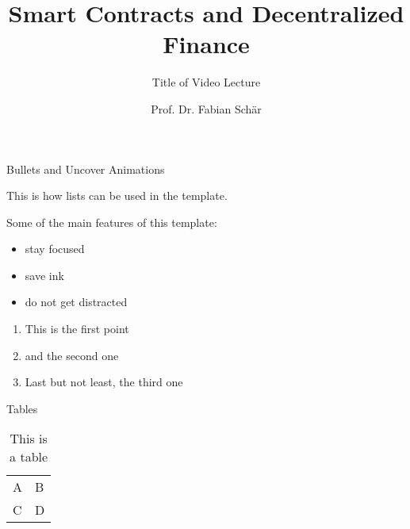 \documentclass[]{beamer}
\title{Smart Contracts and Decentralized Finance}
\subtitle{Title of Video Lecture}
\author{Prof. Dr. Fabian Schär}
\institute{University of Basel}
\begin{document}
\thispagestyle{empty}
\begin{frame}[noframenumbering]
	\titlepage
\end{frame}

\begin{frame}{Bullets and Uncover Animations}

This is how lists can be used in the template. \\ \vspace{1em}

Some of the main features of this template:
	
	\begin{itemize}
		\item<1-> stay focused
		\item<2-> save ink
		\item<3-> do not get distracted
	\end{itemize}

	\vspace{1em}	

	\begin{enumerate}
		\item<5-> This is the first point
		\item<6-> and the second one
		\item<7-> Last but not least, the third one
	\end{enumerate}
	
\end{frame}

\begin{frame}{Tables}
	\begin{table}
		\begin{tabular}{ll}
			A & B\\
			C & D
		\end{tabular}
		\caption{This is a table}
		\label{tbl:simpletable}
	\end{table}
\end{frame}

\end{document}
